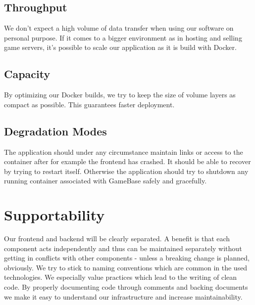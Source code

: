 \documentclass[a4paper,12pt,chapterprefix=false,bibliography=totoc,listof=totoc,]{scrreprt}
\begin{document}
\subsection{Throughput}
We don't expect a high volume of data transfer when using our software on personal purpose. If it comes to a bigger environment as in hosting and selling game servers, it's possible to scale our application as it is build with Docker. 


\subsection{Capacity}
By optimizing our Docker builds, we try to keep the size of volume layers as compact as possible. This guarantees faster deployment.


\subsection{Degradation Modes}
The application should under any circumstance maintain links or access to the container after for example the frontend has crashed. It should be able to recover by trying to restart itself. Otherwise the application should try to shutdown any running container associated with GameBase safely and gracefully. 


\section{Supportability}
Our frontend and backend will be clearly separated. A benefit is that each component acts independently and thus can be maintained separately without getting in conflicts with other components - unless a breaking change is planned, obviously. We try to stick to naming conventions which are common in the used technologies. We especially value practices which lead to the writing of clean code. By properly documenting code through comments and backing documents we make it easy to understand our infrastructure and increase maintainability.
\end{document}
